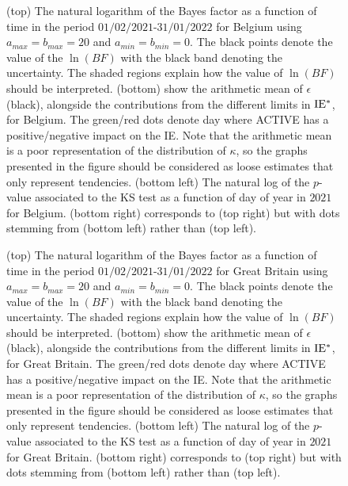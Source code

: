 \documentclass[fleqn,usenatbib,nofootinbib]{revtex4-2}
\begin{document}
\begin{appendices}
		\begin{figure}[H]
			\caption{\label{fig:a3} (top) The natural logarithm of the Bayes factor as a function of time in the period $01/02/2021$-$31/01/2022$ for Belgium using $a_{max}=b_{max}=20$ and $a_{min}=b_{min}=0$. The black points denote the value of the $\ln(BF)$ with the black band denoting the uncertainty. The shaded regions explain how the value of $\ln(BF)$ should be interpreted. (bottom) show the arithmetic mean of $\epsilon$ (black), alongside the contributions from the different limits in $\rm IE^*$, for Belgium. The green/red dots denote day where ACTIVE has a positive/negative impact on the IE. Note that the arithmetic mean is a poor representation of the distribution of $\kappa$, so the graphs presented in the figure should be considered as loose estimates that only represent tendencies. (bottom left) The natural log of the $p$-value associated to the KS test as a function of day of year in $2021$ for Belgium. (bottom right) corresponds to (top right) but with dots stemming from (bottom left) rather than (top left).}
		\end{figure}
		
		\begin{figure}[H]
			\caption{\label{fig:a5} (top) The natural logarithm of the Bayes factor as a function of time in the period $01/02/2021$-$31/01/2022$ for Great Britain using $a_{max}=b_{max}=20$ and $a_{min}=b_{min}=0$. The black points denote the value of the $\ln(BF)$ with the black band denoting the uncertainty. The shaded regions explain how the value of $\ln(BF)$ should be interpreted. (bottom) show the arithmetic mean of $\epsilon$ (black), alongside the contributions from the different limits in $\rm IE^*$, for Great Britain. The green/red dots denote day where ACTIVE has a positive/negative impact on the IE. Note that the arithmetic mean is a poor representation of the distribution of $\kappa$, so the graphs presented in the figure should be considered as loose estimates that only represent tendencies. (bottom left) The natural log of the $p$-value associated to the KS test as a function of day of year in $2021$ for Great Britain. (bottom right) corresponds to (top right) but with dots stemming from (bottom left) rather than (top left).}
		\end{figure}
		

\end{appendices}
\end{document}
